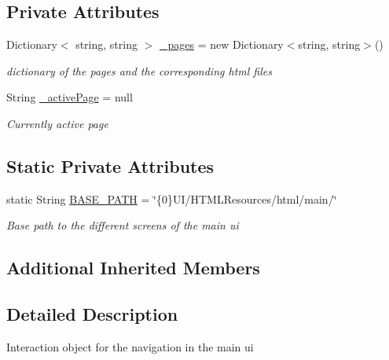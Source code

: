 \subsection*{Private Attributes}
\begin{DoxyCompactItemize}
\item 
Dictionary$<$ string, string $>$ \hyperlink{class_web_analyzer_1_1_u_i_1_1_interaction_objects_1_1_navigation_a57f8147fa5872f86185947f634e43c5e}{\+\_\+pages} = new Dictionary$<$string, string$>$()
\begin{DoxyCompactList}\small\item\em dictionary of the pages and the corresponding html files \end{DoxyCompactList}\item 
String \hyperlink{class_web_analyzer_1_1_u_i_1_1_interaction_objects_1_1_navigation_afd0cf0210ac23b764bf332e97f332ee9}{\+\_\+active\+Page} = null
\begin{DoxyCompactList}\small\item\em Currently active page \end{DoxyCompactList}\end{DoxyCompactItemize}
\subsection*{Static Private Attributes}
\begin{DoxyCompactItemize}
\item 
static String \hyperlink{class_web_analyzer_1_1_u_i_1_1_interaction_objects_1_1_navigation_a2562597149b4eb0542349a2afb17b7e1}{B\+A\+S\+E\+\_\+\+P\+A\+T\+H} = \char`\"{}\{0\}U\+I/H\+T\+M\+L\+Resources/html/main/\char`\"{}
\begin{DoxyCompactList}\small\item\em Base path to the different screens of the main ui \end{DoxyCompactList}\end{DoxyCompactItemize}
\subsection*{Additional Inherited Members}


\subsection{Detailed Description}
Interaction object for the navigation in the main ui 



